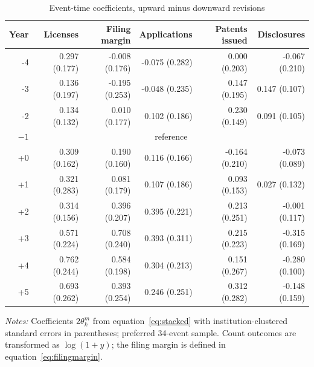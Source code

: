 \begin{table}[htbp]\centering
\caption{Event-time coefficients, upward minus downward revisions}\label{tab:eventtime}
\begin{threeparttable}\scriptsize
\begin{tabular}{rrrrrr}\toprule
Year & Licenses & Filing margin & Applications & Patents issued & Disclosures \\\midrule
-4 & 0.297 (0.177) & -0.008 (0.176) & -0.075 (0.282) & 0.000 (0.203) & -0.067 (0.210) \\
-3 & 0.136 (0.197) & -0.195 (0.253) & -0.048 (0.235) & 0.147 (0.195) & 0.147 (0.107) \\
-2 & 0.134 (0.132) & 0.010 (0.177) & 0.102 (0.186) & 0.230 (0.149) & 0.091 (0.105) \\
$-1$ & \multicolumn{5}{c}{reference} \\
+0 & 0.309 (0.162) & 0.190 (0.160) & 0.116 (0.166) & -0.164 (0.210) & -0.073 (0.089) \\
+1 & 0.321 (0.283) & 0.081 (0.179) & 0.107 (0.186) & 0.093 (0.153) & 0.027 (0.132) \\
+2 & 0.314 (0.156) & 0.396 (0.207) & 0.395 (0.221) & 0.213 (0.251) & -0.001 (0.117) \\
+3 & 0.571 (0.224) & 0.708 (0.240) & 0.393 (0.311) & 0.215 (0.223) & -0.315 (0.169) \\
+4 & 0.762 (0.244) & 0.584 (0.198) & 0.304 (0.213) & 0.151 (0.267) & -0.280 (0.100) \\
+5 & 0.693 (0.262) & 0.393 (0.254) & 0.246 (0.251) & 0.312 (0.282) & -0.148 (0.159) \\
\bottomrule
\end{tabular}
\begin{tablenotes}[flushleft]\footnotesize
\item \textit{Notes:} Coefficients $2\theta^m_k$ from equation~\eqref{eq:stacked} with institution-clustered standard errors in parentheses; preferred 34-event sample. Count outcomes are transformed as $\log(1+y)$; the filing margin is defined in equation~\eqref{eq:filingmargin}.
\end{tablenotes}
\end{threeparttable}
\end{table}
